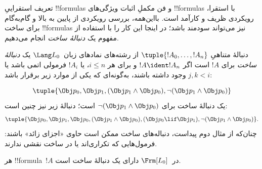 \documentclass[../../../include/open-logic-section]{subfiles}
\begin{document}


تعریف استقراییِ !!{formula}s و فن مکملِ اثبات ویژگی‌های !!{formula}s با
استقرا، رویکردی ظریف و کارآمد است. بااین‌همه، بررسی رویکردی از پایین به بالا
و گام‌به‌گام برای ساخت !!{formula}s نیز می‌تواند سودمند باشد؛ در اینجا این
کار را با استفاده از مفهوم یک \emph{دنبالهٔ ساخت} انجام می‌دهیم.

\begin{defn}
دنبالهٔ متناهیِ $\tuple{!A_0,\dotsc,!A_n}$ از رشته‌های نمادهای
زبان~$\Lang L_0$ یک \emph{دنبالهٔ ساخت} برای $!A$ است اگر
$!A \ident !A_n$ و برای هر $i \leq n$، یا $!A_i$ فرمولی اتمی باشد یا
$j,k < i$ وجود داشته باشند، به‌گونه‌ای که یکی از موارد زیر برقرار باشد:
\begin{enumerate}
\end{enumerate}
\end{defn}

\begin{ex}
\[
\tuple{
    \Obj p_0,
    \Obj p_1,
    (\Obj p_1 \land \Obj p_0),
    \lnot (\Obj p_1 \land \Obj p_0)
}
\]
یک دنبالهٔ ساخت برای
$\lnot (\Obj p_1 \land \Obj p_0)$ است؛ دنبالهٔ زیر نیز چنین است:
\[
\tuple{
    \Obj p_0,
    \Obj p_1,
    \Obj p_0,
    (\Obj p_1 \land \Obj p_0),
    (\Obj p_0 \lif \Obj p_1),
    \lnot (\Obj p_1 \land \Obj p_0)
}.
\]
%
چنان‌که از مثال دوم پیداست، دنباله‌های ساخت ممکن است حاوی «اجزای زائد»
باشند: فرمول‌هایی که تکراری‌اند یا در ساخت نقشی ندارند.
\end{ex}

\begin{prop}
هر !!{formula}~$!A$ در~$\Frm[L_0]$ دارای یک دنبالهٔ ساخت است.
\end{prop}
\end{document}
